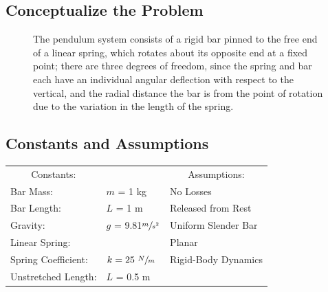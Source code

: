 \documentclass[12pt]{report}
\begin{document}

{\tableofcontents\let\clearpage\relax\listoffigures}
\clearpage
{}
\newpage
\begin{flushleft}

\section{Conceptualize the Problem}


\begin{figure}[h]
  \begin{minipage}[c]{.4\textwidth}
  
\end{minipage}%
\begin{minipage}[c]{.6\textwidth}
  The pendulum system consists of a rigid bar pinned to the free end of a linear spring,
  which rotates about its opposite end at a fixed point; there are three degrees of freedom,
  since the spring and bar each have an individual angular deflection with respect to the vertical,
  and the radial distance the bar is from the point of rotation due to the variation in the
  length of the spring.
\end{minipage}
\end{figure}

\subsection{Constants and Assumptions}
\begin{tabular}{ll@{\hskip .75in}l}
 \multicolumn{1}{c}{Constants:} && \multicolumn{1}{c}{Assumptions:} \\
 Bar Mass: &$m$ = 1 kg & No Losses\\
 Bar Length: &$L$ = 1 m & Released from Rest\\
 Gravity: &$g$ = 9.81$\sfrac{m}{s^2}$ &Uniform Slender Bar \\
 Linear Spring: &&Planar\\
 \quad Spring Coefficient:& $k = 25~\sfrac{N}{m}$ &Rigid-Body Dynamics \\
 \quad Unstretched Length:& $L$ = 0.5 m \\
\end{tabular}
\vspace{5ex}


\end{flushleft}
\end{document}
